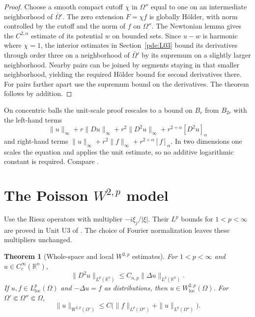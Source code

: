 \documentclass[11pt,oneside,openany]{book}
\theoremstyle{plain}
\newtheorem{theorem}{Theorem}[chapter]
\theoremstyle{definition}
\theoremstyle{remark}
\begin{document}
\begin{proof}
Choose a smooth compact cutoff \(\chi\) in \(\Omega''\) equal to
one on an intermediate neighborhood of \(\bar\Omega'\).
The zero extension \(F=\chi f\) is globally Hölder, with norm
controlled by the cutoff and the norm of \(f\) on \(\Omega''\).
The Newtonian lemma gives the \(C^{2,\alpha}\) estimate of its
potential \(w\) on bounded sets. Since \(u-w\) is harmonic
where \(\chi=1\), the interior estimates in Section~\ref{pde:L03}
bound its derivatives through order three on a neighborhood
of \(\bar\Omega'\) by its supremum on a slightly larger
neighborhood. Nearby pairs can be joined by segments staying
in that smaller neighborhood, yielding the required Hölder
bound for second derivatives there. For pairs farther apart
use the supremum bound on the derivatives. The theorem follows
by addition.
\end{proof}

On concentric balls the unit-scale proof rescales to a bound on
\(B_r\) from \(B_{2r}\) with the left-hand terms
\[
 \|u\|_\infty+r\|Du\|_\infty+
 r^2\|D^2u\|_\infty+r^{2+\alpha}[D^2u]_\alpha
\]
and right-hand terms
\(\|u\|_\infty+r^2\|f\|_\infty+r^{2+\alpha}[f]_\alpha\).
In two dimensions one scales the equation and applies the unit
estimate, so no additive logarithmic constant is required.
Compare \cite[Section 4.3]{GT}.

\section{The Poisson \texorpdfstring{\(W^{2,p}\)}{W(2,p)} model}\label{pde:E08}

Use the Riesz operators with multiplier \(-i\xi_j/|\xi|\).
Their \(L^p\) bounds for \(1<p<\infty\) are proved in Unit U3
of \cite{P102}. The choice of Fourier normalization leaves
these multipliers unchanged.

\begin{theorem}[Whole-space and local \(W^{2,p}\) estimates]
\label{pde:elliptic-poisson-w2p}
For \(1<p<\infty\) and \(u\in C_c^\infty(\mathbb R^n)\),
\[
 \|D^2u\|_{L^p(\mathbb R^n)}
     \leq C_{n,p}\|\Delta u\|_{L^p(\mathbb R^n)} .
\]
If \(u,f\in L^p_{\mathrm{loc}}(\Omega)\) and
\(-\Delta u=f\) as distributions, then \(u\in W^{2,p}_{\mathrm{loc}}(\Omega)\).
For \(\Omega'\Subset\Omega''\Subset\Omega\),
\[
 \|u\|_{W^{2,p}(\Omega')}
 \leq C\bigl(\|f\|_{L^p(\Omega'')}+\|u\|_{L^p(\Omega'')}\bigr).
\]
\end{theorem}
\end{document}
